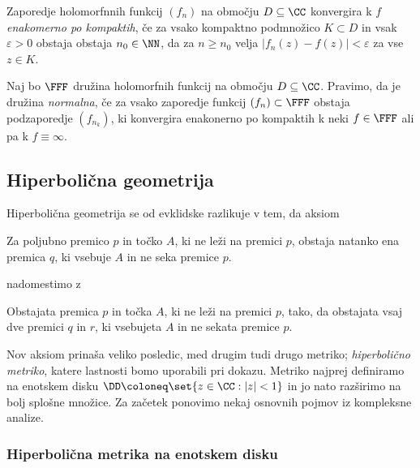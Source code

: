 \begin{definicija}
    Zaporedje holomorfnnih funkcij \((f_n)\) na območju \(D \subseteq \CC\) konvergira k \(f\) \emph{enakomerno po kompaktih}, če za vsako kompaktno podmnožico \(K \subset D\) in vsak \(\varepsilon > 0\) obstaja obstaja \(n_0 \in \NN\), da za \(n \geq n_0\) velja \(|f_n (z) - f(z)| < \varepsilon\) za vse \(z \in K\).
\end{definicija}

\begin{definicija}
    Naj bo \(\FFF\) družina holomorfnih funkcij na območju \(D \subseteq \CC\). Pravimo, da je družina \emph{normalna}, če za vsako zaporedje funkcij \((f_n) \subset \FFF\) obstaja podzaporedje \((f_{n_k})\), ki konvergira enakonerno po kompaktih k neki \(f \in \FFF\) ali pa k \(f \equiv \infty\).
\end{definicija}

\subsection{Hiperbolična geometrija}

Hiperbolična geometrija se od evklidske razlikuje v tem, da aksiom

\begin{aksiom}
    Za poljubno premico \(p\) in točko \(A\), ki ne leži na premici \(p\), obstaja natanko ena premica \(q\), ki vsebuje \(A\) in ne seka premice \(p\).
\end{aksiom}

\noindent nadomestimo z

\begin{aksiom}
    Obstajata premica \(p\) in točka \(A\), ki ne leži na premici \(p\), tako, da obstajata vsaj dve premici \(q\) in \(r\), ki vsebujeta \(A\) in ne sekata premice \(p\).
\end{aksiom}

\noindent Nov aksiom prinaša veliko posledic, med drugim tudi drugo metriko; \emph{hiperbolično metriko}, katere lastnosti bomo uporabili pri dokazu. Metriko najprej definiramo na enotskem disku \(\DD \coloneq \set{z \in \CC : |z| < 1}\) in jo nato razširimo na bolj splošne množice. Za začetek ponovimo nekaj osnovnih pojmov iz kompleksne analize.

\subsubsection{Hiperbolična metrika na enotskem disku}

